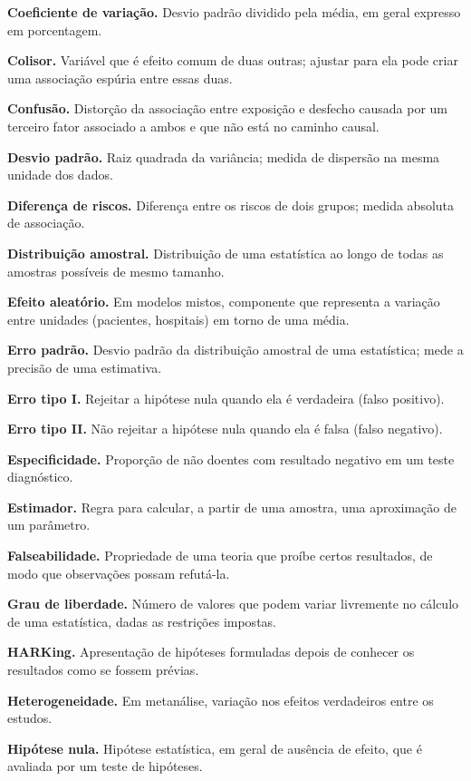 \documentclass[
]{book}
\begin{document}
\textbf{Coeficiente de variação.} Desvio padrão dividido pela média, em geral expresso em porcentagem.

\textbf{Colisor.} Variável que é efeito comum de duas outras; ajustar para ela pode criar uma associação espúria entre essas duas.

\textbf{Confusão.} Distorção da associação entre exposição e desfecho causada por um terceiro fator associado a ambos e que não está no caminho causal.

\textbf{Desvio padrão.} Raiz quadrada da variância; medida de dispersão na mesma unidade dos dados.

\textbf{Diferença de riscos.} Diferença entre os riscos de dois grupos; medida absoluta de associação.

\textbf{Distribuição amostral.} Distribuição de uma estatística ao longo de todas as amostras possíveis de mesmo tamanho.

\textbf{Efeito aleatório.} Em modelos mistos, componente que representa a variação entre unidades (pacientes, hospitais) em torno de uma média.

\textbf{Erro padrão.} Desvio padrão da distribuição amostral de uma estatística; mede a precisão de uma estimativa.

\textbf{Erro tipo I.} Rejeitar a hipótese nula quando ela é verdadeira (falso positivo).

\textbf{Erro tipo II.} Não rejeitar a hipótese nula quando ela é falsa (falso negativo).

\textbf{Especificidade.} Proporção de não doentes com resultado negativo em um teste diagnóstico.

\textbf{Estimador.} Regra para calcular, a partir de uma amostra, uma aproximação de um parâmetro.

\textbf{Falseabilidade.} Propriedade de uma teoria que proíbe certos resultados, de modo que observações possam refutá-la.

\textbf{Grau de liberdade.} Número de valores que podem variar livremente no cálculo de uma estatística, dadas as restrições impostas.

\textbf{HARKing.} Apresentação de hipóteses formuladas depois de conhecer os resultados como se fossem prévias.

\textbf{Heterogeneidade.} Em metanálise, variação nos efeitos verdadeiros entre os estudos.

\textbf{Hipótese nula.} Hipótese estatística, em geral de ausência de efeito, que é avaliada por um teste de hipóteses.
\end{document}
